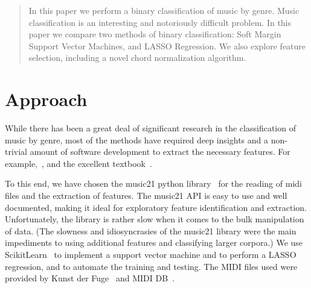 \documentclass[twocolumn,dvipsnames]{article}
\begin{document}

\begin{abstract}
In this paper we perform a binary classification of music by genre.
Music classification is an interesting and notoriously difficult problem.
In this paper we compare two methods of binary classification:
Soft Margin Support Vector Machines, and LASSO Regression.
We also explore feature selection,
including a novel chord normalization algorithm.
\end{abstract}

\section{Approach}
While there has been a great deal of significant research in the classification of music by genre,
most of the methods have required deep insights and a non-trivial amount of software development to extract the necessary features.
For example,~\cite{li2003comparative}, and the excellent textbook~\cite{weihs2016music}.

To this end, we have chosen the music21 python library~\cite{cuthbertMusic21} for the reading of midi files and the extraction of features.
The music21 API is easy to use and well documented, making it ideal for exploratory feature identification and extraction.
Unfortunately, the library is rather slow when it comes to the bulk manipulation of data.
(The slowness and idiosyncrasies of the music21 library were the main impediments to using additional features and classifying larger corpora.)
We use ScikitLearn~\cite{scikitLearn} to implement a support vector machine and to perform a LASSO regression,
and to automate the training and testing.
The MIDI files used were provided by Kunst der Fuge~\cite{wwwKunstderfuge} and MIDI DB~\cite{wwwMidiDb}.
\end{document}
